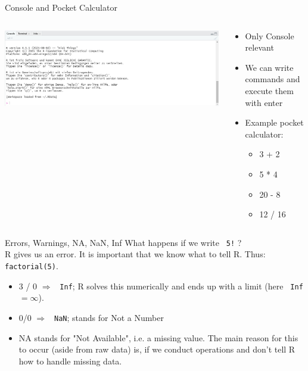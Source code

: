\documentclass[aspectratio = 169]{chariteBeamer}
\begin{document}
\begin{frame}{Console and Pocket Calculator}
	\begin{columns}[T]
	\begin{column}{0.6\textwidth}
	\includegraphics[width=\textwidth]{Rstudio_interface_c}
	\end{column}
	\begin{column}{0.4\textwidth}
	\begin{itemize}
		\item Only \glqq Console\grqq{} relevant
		\item We can write commands and execute them with enter
		\item Example pocket calculator:
		\begin{itemize}
			\item 3 + 2
			\item 5 * 4
			\item 20 - 8
			\item 12 / 16
		\end{itemize}
	\end{itemize}
	\end{column}
\end{columns}
\end{frame}

\begin{frame}[fragile]{Errors, Warnings, NA, NaN, Inf}
	What happens if we write \verb+ 5!+ ? \\
	R gives us an error. It is important that we know what to tell R. Thus: \verb+ factorial(5)+. \\
	\begin{itemize}
		\item 3 / 0 $\Rightarrow$ \verb+ Inf+; R solves this numerically and ends up with a limit (here \verb+ Inf+ $=\infty$).
		\item 0/0 $\Rightarrow$ \verb+ NaN+; stands for \glqq Not a Number\grqq{}
		\item NA stands for "Not Available", i.e. a missing value. The main reason for this to occur (aside from raw data) is, if we conduct operations and don't tell R how to handle missing data.
	\end{itemize}

\end{frame}
\end{document}
